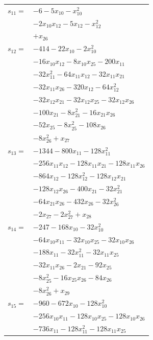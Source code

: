 \begin{longtable}{@{}r@{\;}l@{}}
\(s_{11}=\) & \(\displaystyle -6 -5x_{10} -x_{10}^{2}\) \\
 & \(\displaystyle -2x_{10}x_{12} -5x_{12} -x_{12}^{2}\) \\
 & \(\displaystyle +x_{26}\) \\[3pt]
\(s_{12}=\) & \(\displaystyle -414 -22x_{10} -2x_{10}^{2}\) \\
 & \(\displaystyle -16x_{10}x_{12} -8x_{10}x_{25} -200x_{11}\) \\
 & \(\displaystyle -32x_{11}^{2} -64x_{11}x_{12} -32x_{11}x_{21}\) \\
 & \(\displaystyle -32x_{11}x_{26} -320x_{12} -64x_{12}^{2}\) \\
 & \(\displaystyle -32x_{12}x_{21} -32x_{12}x_{25} -32x_{12}x_{26}\) \\
 & \(\displaystyle -100x_{21} -8x_{21}^{2} -16x_{21}x_{26}\) \\
 & \(\displaystyle -52x_{25} -8x_{25}^{2} -108x_{26}\) \\
 & \(\displaystyle -8x_{26}^{2} +x_{27}\) \\[3pt]
\(s_{13}=\) & \(\displaystyle -1344 -800x_{11} -128x_{11}^{2}\) \\
 & \(\displaystyle -256x_{11}x_{12} -128x_{11}x_{21} -128x_{11}x_{26}\) \\
 & \(\displaystyle -864x_{12} -128x_{12}^{2} -128x_{12}x_{21}\) \\
 & \(\displaystyle -128x_{12}x_{26} -400x_{21} -32x_{21}^{2}\) \\
 & \(\displaystyle -64x_{21}x_{26} -432x_{26} -32x_{26}^{2}\) \\
 & \(\displaystyle -2x_{27} -2x_{27}^{2} +x_{28}\) \\[3pt]
\(s_{14}=\) & \(\displaystyle -247 -168x_{10} -32x_{10}^{2}\) \\
 & \(\displaystyle -64x_{10}x_{11} -32x_{10}x_{25} -32x_{10}x_{26}\) \\
 & \(\displaystyle -188x_{11} -32x_{11}^{2} -32x_{11}x_{25}\) \\
 & \(\displaystyle -32x_{11}x_{26} -2x_{21} -92x_{25}\) \\
 & \(\displaystyle -8x_{25}^{2} -16x_{25}x_{26} -84x_{26}\) \\
 & \(\displaystyle -8x_{26}^{2} +x_{29}\) \\[3pt]
\(s_{15}=\) & \(\displaystyle -960 -672x_{10} -128x_{10}^{2}\) \\
 & \(\displaystyle -256x_{10}x_{11} -128x_{10}x_{25} -128x_{10}x_{26}\) \\
 & \(\displaystyle -736x_{11} -128x_{11}^{2} -128x_{11}x_{25}\) \\

\end{longtable}
